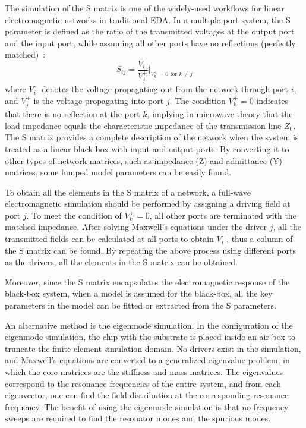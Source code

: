 \documentclass[a4paper,onecolumn,11pt,unpublished]{quantumarticle}
\begin{document}
The simulation of the S matrix is one of the widely-used workflows for linear electromagnetic networks in traditional EDA. In a multiple-port system, the S parameter is defined as the ratio of the transmitted voltages at the output port and the input port, while assuming all other ports have no reflections (perfectly matched)~\cite{Pozar2012Microwave}:
\begin{equation}
S_{ij} = \frac{V_i^-}{V_j^+} \bigg|_{
V_k^+ = 0 \text{ for } k \neq j
}
\end{equation}
where $V_i^-$ denotes the voltage propagating out from the network through port $i$, and $V_j^+$ is the voltage propagating into port $j$. The condition $V_k^+ = 0$ indicates that there is no reflection at the port $k$, implying in microwave theory that the load impedance equals the characteristic impedance of the transmission line $Z_0$. 
The S matrix provides a complete description of the network when the system is treated as a linear black-box with input and output ports. By converting it to other types of network matrices, such as impedance (Z) and admittance (Y) matrices, some lumped model parameters can be easily found. 

To obtain all the elements in the S matrix of a network, a full-wave electromagnetic simulation should be performed by assigning a driving field at port $j$. To meet the condition of $V_k^+ = 0$, all other ports are terminated with the matched impedance. After solving Maxwell's equations under the driver $j$, all the transmitted fields can be calculated at all ports to obtain $V_i^-$, thus a column of the S matrix can be found. By repeating the above process using different ports as the drivers, all the elements in the S matrix can be obtained.  

Moreover, since the S matrix encapsulates the electromagnetic response of the black-box system, when a model is assumed for the black-box, all the key parameters in the model can be fitted or extracted from the S parameters. 

An alternative method is the eigenmode simulation. In the configuration of the eigenmode simulation, the chip with the substrate is placed inside an air-box to truncate the finite element simulation domain. 
No drivers exist in the simulation, and Maxwell's equations are converted to a generalized eigenvalue problem, in which the core matrices are the stiffness and mass matrices. The eigenvalues correspond to the resonance frequencies of the entire system, and from each eigenvector, one can find the field distribution at the corresponding resonance frequency. 
The benefit of using the eigenmode simulation is that no frequency sweeps are required to find the resonator modes and the spurious modes.
\end{document}
